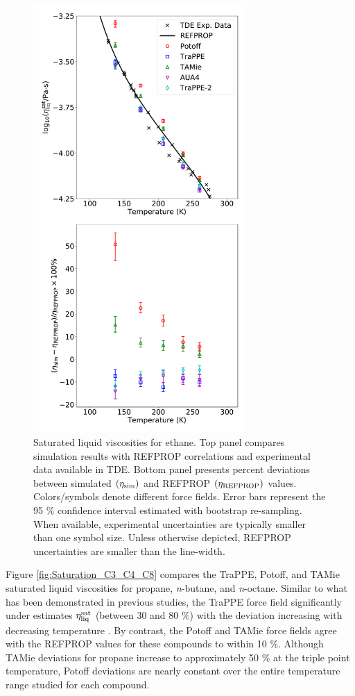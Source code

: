 \documentclass[preprint,review,12pt]{elsarticle}
\begin{document}
	\begin{figure}[htb!]
		\centering
		\includegraphics[width=3.2in]{compare_force_fields_ethane.pdf}
		\caption{Saturated liquid viscosities for ethane. Top panel compares simulation results with REFPROP correlations and experimental data available in TDE. Bottom panel presents percent deviations between simulated $(\eta_{\rm sim})$ and REFPROP $(\eta_{\rm REFPROP})$ values. Colors/symbols denote different force fields. Error bars represent the 95 \% confidence interval estimated with bootstrap re-sampling. When available, experimental uncertainties are typically smaller than one symbol size. Unless otherwise depicted, REFPROP uncertainties are smaller than the line-width.}
		\label{fig:Saturation_Ethane}
	\end{figure} 
	
	Figure \ref{fig:Saturation_C3_C4_C8} compares the TraPPE, Potoff, and TAMie saturated liquid viscosities for propane, \textit{n}-butane, and \textit{n}-octane. Similar to what has been demonstrated in previous studies, the TraPPE force field significantly under estimates $\eta_{\rm liq}^{\rm sat}$ (between 30 and 80 \%) with the deviation increasing with decreasing temperature \cite{Gordon2006,Nieto2006}. By contrast, the Potoff and TAMie force fields agree with the REFPROP values for these compounds to within 10 \%. Although TAMie deviations for propane increase to approximately 50 \% at the triple point temperature, Potoff deviations are nearly constant over the entire temperature range studied for each compound. 
	
\end{document}
